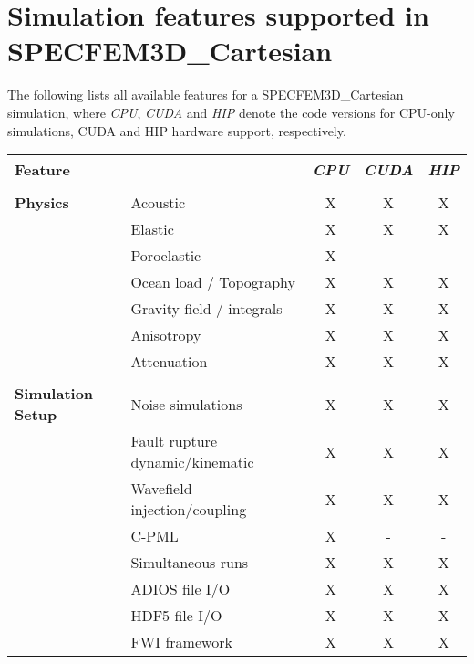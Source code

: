 \chapter*{Simulation features supported in SPECFEM3D\_Cartesian}

The following lists all available features for a SPECFEM3D\_Cartesian simulation,
where {\it CPU}, {\it CUDA} and {\it HIP} denote the code versions for CPU-only simulations,
CUDA and HIP hardware support, respectively.
%
\begin{table}[htp]
\vspace{-1cm}
\label{table:features}
\begin{center}
\begin{tabular}{ l l c c c}
\hline
{\bf Feature}   &   & {\it CPU} & {\it CUDA} & {\it HIP} \\
\hline
& & & & \\
{\bf Physics}   & Acoustic                        & X  & X  & X \\
                & Elastic                         & X  & X  & X \\
                & Poroelastic                     & X  & -  & - \\
                & Ocean load / Topography         & X  & X  & X \\
                & Gravity field / integrals       & X  & X  & X \\
                & Anisotropy                      & X  & X  & X \\
                & Attenuation                     & X  & X  & X \\
\hline
& & & & \\
{\bf Simulation Setup}  & Noise simulations                 & X  & X  & X \\
                        & Fault rupture dynamic/kinematic   & X  & X  & X \\
                        & Wavefield injection/coupling      & X  & X  & X \\
                        & C-PML                             & X  & -  & - \\
                        & Simultaneous runs                 & X  & X  & X \\
                        & ADIOS file I/O                    & X  & X  & X \\
                        & HDF5 file I/O                     & X  & X  & X \\
                        & FWI framework                     & X  & X  & X \\


\end{tabular}
\end{center}
\end{table}

